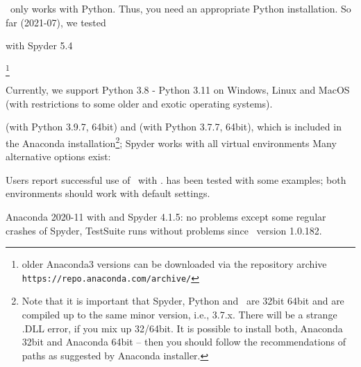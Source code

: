 \codeName\ only works with Python. Thus, you need an appropriate Python installation.
So far (2021-07), we tested
\bi
  \item {} with Spyder 5.4
  \item {}\footnote{older Anaconda3 versions can be downloaded via the repository archive \texttt{https://repo.anaconda.com/archive/}}
  \item Currently, we support Python 3.8 - Python 3.11  on Windows, Linux and MacOS (with restrictions to some older and exotic operating systems).
  \item {} (with Python 3.9.7, 64bit) and  (with Python 3.7.7, 64bit), which is included in the Anaconda installation\footnote{Note that it is important that Spyder, Python and \codeName\  are  32bit  64bit and are compiled up to the same minor version, i.e., 3.7.x. There will be a strange .DLL error, if you mix up 32/64bit. It is possible to install both, Anaconda 32bit and Anaconda 64bit -- then you should follow the recommendations of paths as suggested by Anaconda installer.}; Spyder works with all virtual environments
\ei
Many alternative options exist:
\bi
  \item Users report successful use of \codeName\ with .  has been tested with some examples; both environments should work with default settings.
  \item Anaconda 2020-11 with  and Spyder 4.1.5: no problems except some regular crashes of Spyder, TestSuite runs without problems since \codeName\ version 1.0.182.
